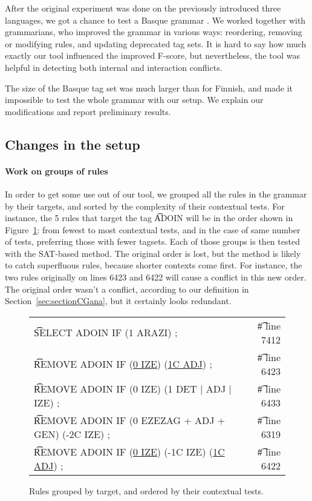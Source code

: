 {{After the original experiment was done on the previously introduced
three languages, we got a chance to test a Basque grammar
\cite{aduriz1997euscg}. We worked together with grammarians, who
improved the grammar in various ways: reordering, removing or
modifying rules, and updating deprecated tag sets. It is hard to
say how much exactly our tool influenced the improved F-score, but
nevertheless, the tool was helpful in detecting both internal and
interaction conflicts.

The size of the Basque tag set was much larger than for Finnish, and
made it impossible to test the whole grammar with our setup. We
explain our modifications and report preliminary results.

\subsection{Changes in the setup}
\label{sec:basqueChanges}

\paragraph{Work on groups of rules} In order to get some use out of our tool, we grouped all the rules in the
grammar by their targets, and sorted by the complexity of their
contextual tests. For instance, the 5 rules that target the tag
\t{ADOIN} will be in the order shown in Figure~\ref{fig:basqueSorted}:
from fewest to most contextual tests, and in the case of same number
of tests, preferring those with fewer tagsets.  Each of those groups
is then tested with the SAT-based method. The original order is lost,
but the method is likely to catch superfluous rules, because
shorter contexts come first. For instance, the two rules originally on
lines 6423 and 6422 will cause a conflict in this new order. The
original order wasn't a conflict, according to our definition in
Section~\ref{sec:sectionCGana}, but it certainly looks redundant.


\begin{figure}[h]
\centering
\begin{tabular}{lr}
\t{SELECT ADOIN IF (1 ARAZI) ;}                         & \t{\# line 7412} \\
\t{REMOVE ADOIN IF (\underline{0 IZE}) (\underline{1C ADJ}) ;}                  & \t{\# line 6423} \\
\t{REMOVE ADOIN IF (0 IZE) (1 DET | ADJ | IZE) ;}       & \t{\# line 6433} \\
\t{REMOVE ADOIN IF (0 EZEZAG + ADJ + GEN) (-2C IZE) ;}  & \t{\# line 6319} \\
\t{REMOVE ADOIN IF (\underline{0 IZE}) (-1C IZE) (\underline{1C ADJ}) ;}        & \t{\# line 6422} \\
\end{tabular}
\caption{Rules grouped by target, and ordered by their contextual tests.}
\label{fig:basqueSorted}
\end{figure}

}}
